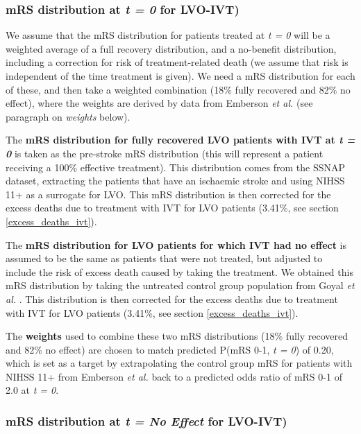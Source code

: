\subsubsection{mRS distribution at \textit{t = 0} for LVO-IVT)}

We assume that the mRS distribution for patients treated at \textit{t = 0} will be a weighted average of a full recovery distribution, and a no-benefit distribution, including a correction for risk of treatment-related death (we assume that risk is independent of the time treatment is given). We need a mRS distribution for each of these, and then take a weighted combination (18\% fully recovered and 82\% no effect), where the weights are derived by data from Emberson \textit{et al.} \cite{emberson_effect_2014} (see paragraph on \textit{weights} below).

The \textbf{mRS distribution for fully recovered LVO patients with IVT at \textit{t = 0}} is taken as the pre-stroke mRS distribution (this will represent a patient receiving a 100\% effective treatment). This distribution comes from the SSNAP dataset, extracting the patients that have an ischaemic stroke and using NIHSS 11+ as a surrogate for LVO. This mRS distribution is then corrected for the excess deaths due to treatment with IVT for LVO patients (3.41\%, see section \ref{excess_deaths_ivt}).

The\textbf{ mRS distribution for LVO patients for which IVT had no effect} is assumed to be the same as patients that were not treated, but adjusted to include the risk of excess death caused by taking the treatment. We obtained this mRS distribution by taking the untreated control group population from Goyal \textit{et al.} \cite{goyal_endovascular_2016}. This distribution is then corrected for the excess deaths due to treatment with IVT for LVO patients (3.41\%, see section \ref{excess_deaths_ivt}).

The \textbf{weights} used to combine these two mRS distributions (18\% fully recovered and 82\% no effect) are chosen to match predicted P(mRS 0-1, \textit{t = 0}) of 0.20, which is set as a target by extrapolating the control group mRS for patients with NIHSS 11+ from Emberson\textit{ et al.} \cite{emberson_effect_2014} back to a predicted odds ratio of mRS 0-1 of 2.0 at \textit{t = 0}.

\subsubsection{mRS distribution at \textit{t = No Effect} for LVO-IVT)}

